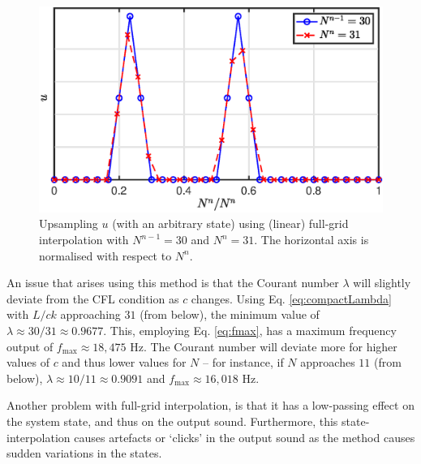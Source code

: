 \documentclass[dvipsnames, reprint]{JASA}
\begin{document}
\begin{figure}[ht]
\includegraphics[width=\reprintcolumnwidth]{fullGrid}
\caption{\label{fig:fullGrid}{Upsampling $u$ (with an arbitrary state) using (linear) full-grid interpolation with $N^{n-1} = 30$ and $N^n = 31$. The horizontal axis is normalised with respect to $N^n$.}}
\end{figure} 

An issue that arises using this method is that the Courant number $\lambda$ will slightly deviate from the CFL condition as $c$ changes. Using Eq. \eqref{eq:compactLambda} with $L/ck$ approaching $31$ (from below), the minimum value of $\lambda \approx 30/31 \approx 0.9677$.
This, employing Eq. \eqref{eq:fmax}, has a maximum frequency output of $f_\text{max} \approx 18,475$ Hz. 
The Courant number will deviate more for higher values of $c$ and thus lower values for $N$ -- for instance, if $N$ approaches $11$ (from below), $\lambda \approx 10/11 \approx 0.9091$ and $f_\text{max} \approx 16,018$ Hz.

Another problem with full-grid interpolation, is that it has a low-passing effect on the system state, and thus on the output sound. %
Furthermore, this state-interpolation causes artefacts or `clicks' in the output sound as the method causes sudden variations in the states.  
\end{document}
